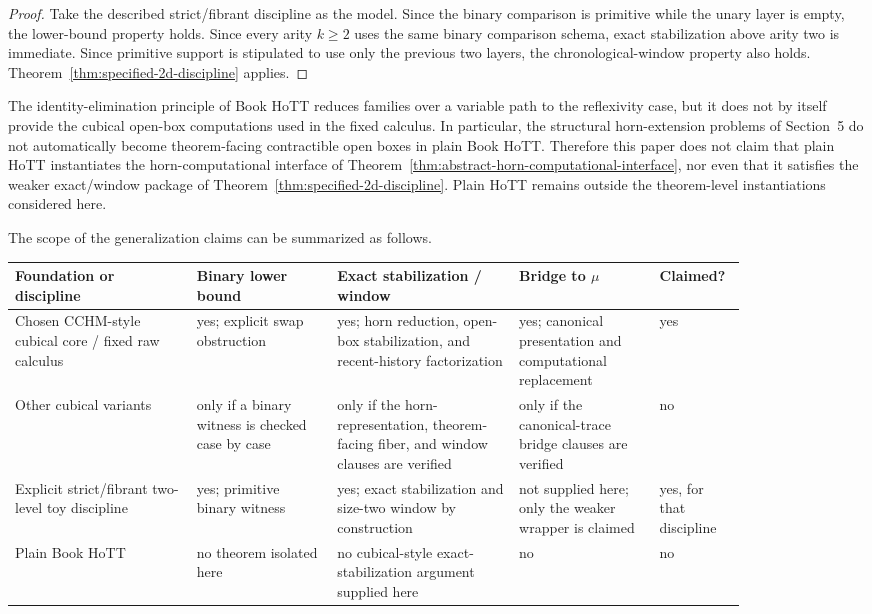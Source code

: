 \begin{proof}
Take the described strict/fibrant discipline as the model.  Since the binary comparison is
primitive while the unary layer is empty, the lower-bound property holds.  Since every arity
\(k\geq 2\) uses the same binary comparison schema, exact stabilization above arity two is
immediate.  Since primitive support is stipulated to use only the previous two layers, the
chronological-window property also holds.  Theorem~\ref{thm:specified-2d-discipline} applies.
\end{proof}

\begin{remark}
\label{rem:plain-hott-not-claimed}
The identity-elimination principle of Book HoTT reduces families over a variable path to the
reflexivity case, but it does not by itself provide the cubical open-box computations used in
the fixed calculus.  In particular, the structural horn-extension problems of Section~5 do not
automatically become theorem-facing contractible open boxes in plain Book HoTT.  Therefore
this paper does not claim that plain HoTT instantiates the horn-computational interface of
Theorem~\ref{thm:abstract-horn-computational-interface}, nor even that it satisfies the
weaker exact/window package of Theorem~\ref{thm:specified-2d-discipline}.  Plain HoTT remains
outside the theorem-level instantiations considered here.
\end{remark}

The scope of the generalization claims can be summarized as follows.

\begin{center}
\scriptsize
\setlength{\tabcolsep}{2pt}
\begin{tabular}{p{0.22\linewidth}p{0.17\linewidth}p{0.22\linewidth}p{0.17\linewidth}p{0.07\linewidth}}
\hline
Foundation or discipline & Binary lower bound & Exact stabilization / window & Bridge to \(\mu\) & Claimed? \\
\hline
Chosen CCHM-style cubical core / fixed raw calculus
& yes; explicit swap obstruction
& yes; horn reduction, open-box stabilization, and recent-history factorization
& yes; canonical presentation and computational replacement
& yes \\
\hline
Other cubical variants
& only if a binary witness is checked case by case
& only if the horn-representation, theorem-facing fiber, and window clauses are verified
& only if the canonical-trace bridge clauses are verified
& no \\
\hline
Explicit strict/fibrant two-level toy discipline
& yes; primitive binary witness
& yes; exact stabilization and size-two window by construction
& not supplied here; only the weaker wrapper is claimed
& yes, for that discipline \\
\hline
Plain Book HoTT
& no theorem isolated here
& no cubical-style exact-stabilization argument supplied here
& no
& no \\
\hline
\end{tabular}
\end{center}

